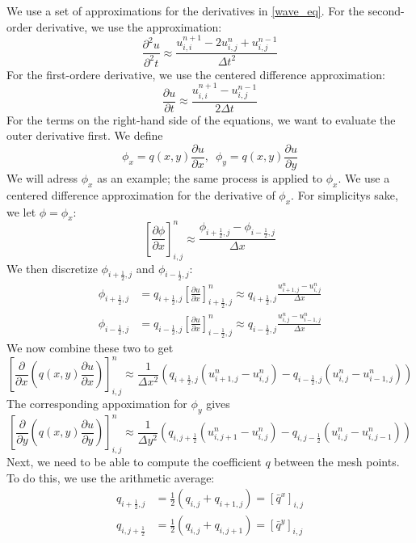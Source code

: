 \documentclass[11pt]{article} %
\newcommand{\Dx}{\Delta x}
\newcommand{\Dy}{\Delta y}
\newcommand{\Dt}{\Delta t}
\newcommand{\dutt}{\frac{\partial^2u}{\partial^2t}}
\newcommand{\dut}{\frac{\partial u}{\partial t}}
\newcommand{\dux}{\frac{\partial u}{\partial x}}
\newcommand{\duy}{\frac{\partial u}{\partial y}}
\newcommand{\dx}{\frac{\partial}{\partial x}}
\newcommand{\dy}{\frac{\partial}{\partial y}}
\newcommand{\unp}{u^{n+1}}
\newcommand{\un}{u^{n}}
\newcommand{\unm}{u^{n-1}}
\newcommand{\half}{\frac{1}{2}}
\begin{document}
We use a set of approximations for the derivatives in \eqref{wave_eq}. For the second-order derivative, we use the approximation:
\begin{equation*}
\dutt \approx \frac{\unp_{i,i} - 2\un_{i,j} + \unm_{i,j}}{\Dt^2}
\end{equation*}
For the first-ordere derivative, we use the centered difference approximation:
\begin{equation*}
\dut \approx \frac{\unp_{i,i} - \unm_{i,j}}{2\Dt}
\end{equation*}
For the terms on the right-hand side of the equations, we want to evaluate the outer derivative first. We define 
\[\phi_x = q(x,y)\dux, \,\,\,\phi_y = q(x,y)\duy \]
We will adress $\phi_x$ as an example; the same process is applied to $\phi_x$. We use a centered difference approximation for the derivative of $\phi_x$. For simplicitys sake, we let $\phi =\phi_x$:
\begin{equation*}
\left[\frac{\partial\phi}{\partial x}\right]^n_{i,j} \approx \frac{\phi_{i+\half,j} - \phi_{i-\half,j}}{\Dx}
\end{equation*}
We then discretize $\phi_{i+\half,j}$ and $\phi_{i-\half,j}$:
\begin{align*}
\phi_{i+\half,j} &= q_{i+\half,j}\left[\dux\right]^n_{i+\half,j} \approx  q_{i+\half,j}\frac{\un_{i+1,j}-\un_{i,j}}{\Dx} \\
\phi_{i-\half,j} &= q_{i-\half,j}\left[\dux\right]^n_{i-\half,j} \approx  q_{i-\half,j}\frac{\un_{i,j}-\un_{i-1,j}}{\Dx} 
\end{align*}
We now combine these two to get
\begin{equation}
\left[\dx\left(q(x,y) \dux\right)\right]^n_{i,j} \approx \frac{1}{\Dx^2}\left(q_{i+\half,j}(\un_{i+1,j}-\un_{i,j}) - q_{i-\half,j}(\un_{i,j}-\un_{i-1,j})\right)
\end{equation}
The corresponding appoximation for $\phi_y$ gives
\begin{equation}
\left[\dy\left(q(x,y) \duy\right)\right]^n_{i,j} \approx \frac{1}{\Dy^2}\left(q_{i,j+\half}(\un_{i,j+1}-\un_{i,j}) - q_{i,j-\half}(\un_{i,j}-\un_{i,j-1})\right)
\end{equation}
Next, we need to be able to compute the coefficient $q$ between the mesh points. To do this, we use the arithmetic average:
\begin{align*}
q_{i+\half,j} &= \half(q_{i,j} + q_{i+1,j}) = [\bar{q}^x]_{i,j}\\
q_{i,j+\half} &= \half(q_{i,j} + q_{i,j+1}) = [\bar{q}^y]_{i,j}
\end{align*}
\end{document}
